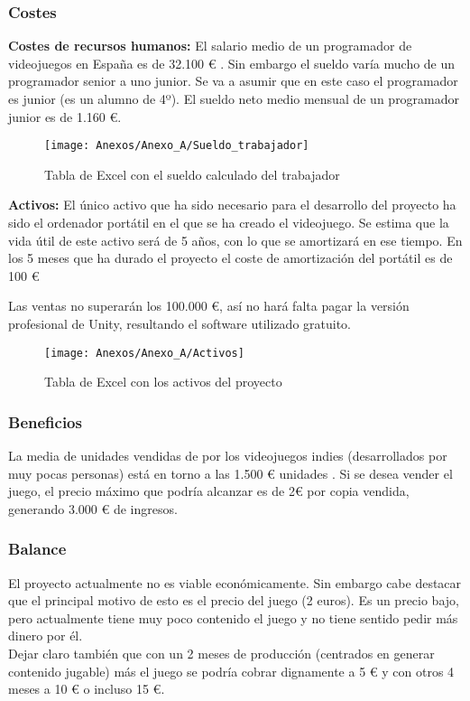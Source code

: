 \subsubsection{Costes}
\textbf{Costes de recursos humanos:}
El salario medio de un programador de videojuegos en España es de 32.100 € \cite{Sueldo}. Sin embargo el sueldo varía mucho de un programador senior a uno junior. Se va a asumir que en este caso el programador es junior (es un alumno de 4º). El sueldo neto medio mensual de un programador junior es de 1.160 €.

\begin{figure}[h]
\centering
\texttt{[image: Anexos/Anexo\_A/Sueldo\_trabajador]}
\caption{Tabla de Excel con el sueldo calculado del trabajador}
\end{figure}

\textbf{Activos:}
El único activo que ha sido necesario para el desarrollo del proyecto ha sido el ordenador portátil en el que se ha creado el videojuego. Se estima que la vida útil de este activo será de 5 años, con lo que se amortizará en ese tiempo. En los 5 meses que ha durado el proyecto el coste de amortización del portátil es de 100 €

Las ventas no superarán los 100.000 €, así no hará falta pagar la versión profesional de Unity, resultando el software utilizado gratuito.

\begin{figure}[h]
\centering
\texttt{[image: Anexos/Anexo\_A/Activos]}
\caption{Tabla de Excel con los activos del proyecto}
\end{figure}

\subsubsection{Beneficios}
La media de unidades vendidas de por los videojuegos indies (desarrollados por muy pocas personas) está en torno a las 1.500 € unidades \cite{Unidades}. Si se desea vender el juego, el precio máximo que podría alcanzar es de 2€ por copia vendida, generando 3.000 € de ingresos.

\subsubsection{Balance}
El proyecto actualmente no es viable económicamente. Sin embargo cabe destacar que el principal motivo de esto es el precio del juego (2 euros). Es un precio bajo, pero actualmente tiene muy poco contenido el juego y no tiene sentido pedir más dinero por él.\\
Dejar claro también que con un 2 meses de producción (centrados en generar contenido jugable) más el juego se podría cobrar dignamente a 5 € y con otros 4 meses a 10 € o incluso 15 €.

